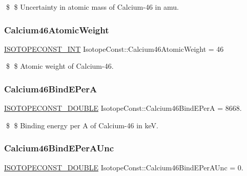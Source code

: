 \$ \$ Uncertainty in atomic mass of Calcium-\/46 in amu. \mbox{\label{group___isotope_const-_calcium-_ca46_ga6ea454076e837c38dc4daa98c6fd986a}} 
\subsubsection{\texorpdfstring{Calcium46\+Atomic\+Weight}{Calcium46AtomicWeight}}
{\footnotesize\ttfamily \mbox{\hyperlink{group___isotope_const-_macros_ga5f18360b3e99483a35c32d789e62621c}{I\+S\+O\+T\+O\+P\+E\+C\+O\+N\+S\+T\+\_\+\+I\+NT}} Isotope\+Const\+::\+Calcium46\+Atomic\+Weight = 46}

\$ \$ Atomic weight of Calcium-\/46. \mbox{\label{group___isotope_const-_calcium-_ca46_gabf725ad48317b98d8d2355cae96044fa}} 
\subsubsection{\texorpdfstring{Calcium46\+Bind\+E\+PerA}{Calcium46BindEPerA}}
{\footnotesize\ttfamily \mbox{\hyperlink{group___isotope_const-_macros_ga8f45a7272ce02c0b4c65c44636ed719a}{I\+S\+O\+T\+O\+P\+E\+C\+O\+N\+S\+T\+\_\+\+D\+O\+U\+B\+LE}} Isotope\+Const\+::\+Calcium46\+Bind\+E\+PerA = 8668.}

\$ \$ Binding energy per A of Calcium-\/46 in keV. \mbox{\label{group___isotope_const-_calcium-_ca46_gab7d7cd697a16dc4f83fb9f0e2a7aec6a}} 
\subsubsection{\texorpdfstring{Calcium46\+Bind\+E\+Per\+A\+Unc}{Calcium46BindEPerAUnc}}
{\footnotesize\ttfamily \mbox{\hyperlink{group___isotope_const-_macros_ga8f45a7272ce02c0b4c65c44636ed719a}{I\+S\+O\+T\+O\+P\+E\+C\+O\+N\+S\+T\+\_\+\+D\+O\+U\+B\+LE}} Isotope\+Const\+::\+Calcium46\+Bind\+E\+Per\+A\+Unc = 0.}

